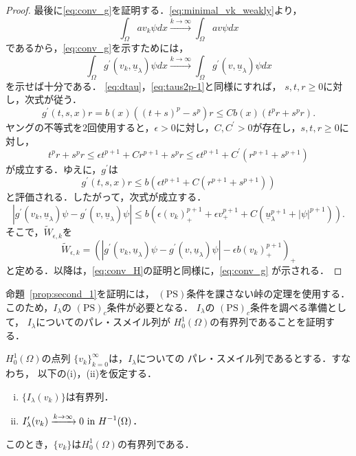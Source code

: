 \begin{proof}
 最後に\eqref{eq:conv_g}を証明する．\eqref{eq:minimal_vk_weakly}より，
 \[
  \int_\Omega a v_k \psi dx \xrightarrow{k \to \infty} \int_\Omega
 av\psi dx
 \]
 であるから，\eqref{eq:conv_g}を示すためには，
 \[
  \int_\Omega g^\prime(v_k, \underline{u}_\lambda)\psi dx \xrightarrow{
  k \to \infty } 
  \int_\Omega g^\prime(v, \underline{u}_\lambda)\psi dx
 \]
 を示せば十分である．
 \eqref{eq:dtau}，\eqref{eq:taus2p-1}と同様にすれば，
 $s, t, r \geq 0$に対し，次式が従う．
 \[
  g^\prime(t, s, x)r = b(x) \left( (t+s)^p - s^p \right) r \leq C b(x)
 \left( t^pr + s^p r \right).
 \]
 ヤングの不等式を$2$回使用すると，$\epsilon > 0$に対し，$C, C^\prime >
 0$が存在し，$s, t, r \geq 0$に対し，
 \[
  t^p r + s^p r \leq \epsilon t^{p+1} + C r^{p+1} + s^p r \leq
 \epsilon t^{p+1} + C^\prime (r^{p+1} + s^{p+1})
 \]
 が成立する．ゆえに，$g^\prime$は
 \[
  g^\prime(t, s, x)r \leq b \left( \epsilon t^{p+1} + C ( r^{p+1} +
 s^{p+1}) \right)
 \]
 と評価される．したがって，次式が成立する．
 \[  
  \left\lvert g^\prime(v_k, \underline{u}_\lambda)\psi - g^\prime(v,
   \underline{u}_\lambda)\psi \right\rvert \leq b \left( \epsilon
   (v_k)_+^{p+1}  + \epsilon v_+^{p+1} + C
   (\underline{u}_\lambda^{p+1} + \lvert \psi \rvert^{p+1})
                                 \right).
 \]
 そこで，$\tilde{W}_{\epsilon, k}$を
\[  \tilde{W}_{\epsilon, k} = 
   \left( \left\lvert g^\prime(v_k, \underline{u}_\lambda)\psi - g^\prime(v,
    \underline{u}_\lambda)\psi \right\rvert
  -\epsilon b (v_k)_+^{p+1}
          \right)_+ \]
 と定める．以降は，\eqref{eq:conv_H}の証明と同様に，\eqref{eq:conv_g}
 が示される．\qedhere
\end{proof}

命題~\ref{prop:second_1}を証明には，
$(\mathrm{PS})$条件を課さない峠の定理を使用する．
このため，$I_\lambda$の
$(\mathrm{PS})_c$条件が必要となる．
$I_\lambda$の
$(\mathrm{PS})_c$条件を調べる準備として，
$I_\lambda$についてのパレ・スメイル列が
$H_0^1(\Omega)$の有界列であることを証明する．

\begin{lem} \label{lem:PS_seq}
 $H_0^1(\Omega)$の点列
 $\{ v_k \}_{k=0}^\infty$は，$I_\lambda$についての
 パレ・スメイル列であるとする．すなわち，
 以下の(i)，(ii)を仮定する．
 \begin{enumerate}[(i)]
  \item $\{ I_\lambda(v_k) \}$は有界列．
  \item $\displaystyle I^\prime_{\lambda} (v_k) \xrightarrow{k \to
        \infty} 0 ~\text{in}~ H^{-1}(\Omega)$．
 \end{enumerate}
 このとき，$\{ v_k \}$は$H_0^1(\Omega)$の有界列である．
\end{lem}

